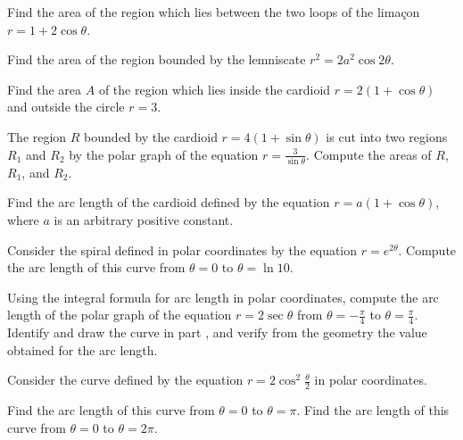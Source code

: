 \begin{exercises}
Find the area of the region which lies between the
two loops of the lima\c{c}on $r=1+2\cos \theta$.

Find the area of the region bounded by the lemniscate
$r^2 = 2a^2 \cos 2\theta$.

Find the area $A$ of the region which lies inside
the cardioid $r=2(1+\cos\theta)$ and outside
the circle $r=3$.

The region $R$ bounded by the cardioid
$r=4(1+\sin\theta)$ is cut into two regions
$R_1$ and $R_2$ by the polar graph of the
equation $r=\frac3{\sin\theta}$.
Compute the areas of $R$, $R_1$, and $R_2$.

Find the arc length of the cardioid defined by the
equation $r=a(1+\cos\theta)$,
where $a$ is an arbitrary positive constant.

Consider the spiral defined in polar coordinates
by the equation $r=e^{2\theta}$.
Compute the arc length of this curve from 
$\theta=0$ to $\theta=\ln 10$.

\begin{exenum}
\x
{}
Using the integral formula for arc length in polar
coordinates, compute the arc length of the polar
graph of the equation $r=2\sec \theta$ from
$\theta = -\frac\pi4$ to $\theta=\frac\pi4$.
\x
Identify and draw the curve in part ,
and verify from the geometry the value obtained
for the arc length.
\end{exenum}

Consider the curve defined by the equation
$r=2\cos^2 \frac\theta2$ in polar coordinates.
\begin{exenum}
\x
Find the arc length of this curve from
$\theta=0$ to $\theta=\pi$.
\x
Find the arc length of this curve from
$\theta=0$ to $\theta=2\pi$.
\end{exenum}

\end{exercises}

